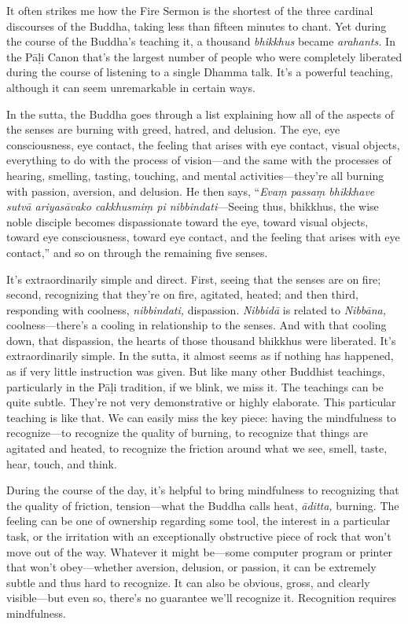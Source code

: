 
It often strikes me how the Fire Sermon is the shortest of the three 
cardinal discourses of the Buddha, taking less than fifteen minutes to 
chant. Yet during the course of the Buddha's teaching it, a thousand 
\emph{bhikkhus} became \emph{arahants.} In the Pāḷi Canon that's the 
largest number of people who were completely liberated during the 
course of listening to a single Dhamma talk. It's a powerful teaching, 
although it can seem unremarkable in certain ways.

In the sutta, the Buddha goes through a list explaining how all of the 
aspects of the senses are burning with greed, hatred, and delusion. The 
eye, eye consciousness, eye contact, the feeling that arises with eye 
contact, visual objects, everything to do with the process of 
vision---and the same with the processes of hearing, smelling, tasting, 
touching, and mental activities---they're all burning with passion, 
aversion, and delusion. He then says, ``\emph{Evaṃ passaṃ bhikkhave 
sutvā ariyasāvako cakkhusmiṃ pi nibbindati}---Seeing thus, 
bhikkhus, the wise noble disciple becomes dispassionate toward the eye, 
toward visual objects, toward eye consciousness, toward eye contact, 
and the feeling that arises with eye contact,'' and so on through the 
remaining five senses.

It's extraordinarily simple and direct. First, seeing that the senses 
are on fire; second, recognizing that they're on fire, agitated, 
heated; and then third, responding with coolness, \emph{nibbindati,} 
dispassion. \emph{Nibbidā} is related to \emph{Nibbāna,} 
coolness---there's a cooling in relationship to the senses. And with 
that cooling down, that dispassion, the hearts of those thousand 
bhikkhus were liberated. It's extraordinarily simple. In the sutta, it 
almost seems as if nothing has happened, as if very little instruction 
was given. But like many other Buddhist teachings, particularly in the 
Pāḷi tradition, if we blink, we miss it. The teachings can be quite 
subtle. They're not very demonstrative or highly elaborate. This 
particular teaching is like that. We can easily miss the key piece: 
having the mindfulness to recognize---to recognize the quality of 
burning, to recognize that things are agitated and heated, to recognize 
the friction around what we see, smell, taste, hear, touch, and think.

During the course of the day, it's helpful to bring mindfulness to 
recognizing that the quality of friction, tension---what the Buddha 
calls heat, \emph{āditta,} burning. The feeling can be one of 
ownership regarding some tool, the interest in a particular task, or 
the irritation with an exceptionally obstructive piece of rock that 
won't move out of the way. Whatever it might be---some computer program 
or printer that won't obey---whether aversion, delusion, or passion, it 
can be extremely subtle and thus hard to recognize. It can also be 
obvious, gross, and clearly visible---but even so, there's no guarantee 
we'll recognize it. Recognition requires mindfulness.

